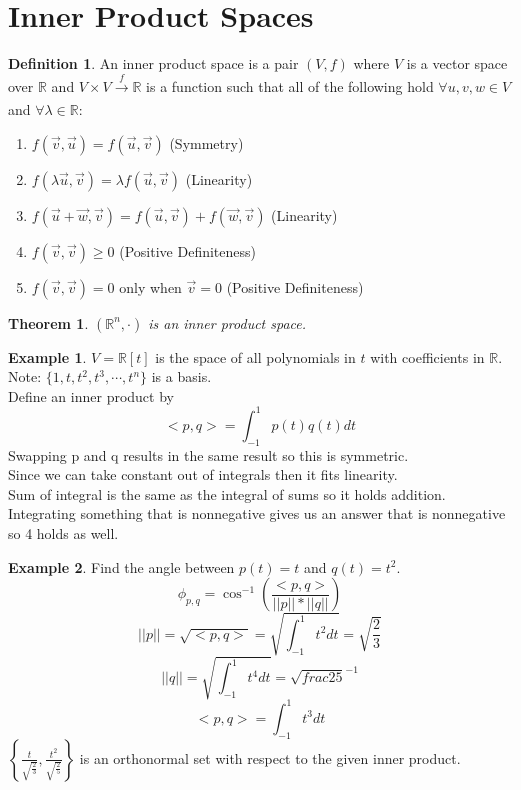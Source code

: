 \documentclass{report}
\theoremstyle{plain}
\newtheorem*{thrm}{Theorem}
\theoremstyle{definition}
\newtheorem*{ex}{Example}
\newtheorem*{defn}{Definition}
\theoremstyle{plain}
\begin{document}
\section{Inner Product Spaces}
\begin{defn}
An inner product space is a pair $(V,f)$ where $V$ is a vector space over $\mathbb{R}$ and $V\times V\xrightarrow[]{f}\mathbb{R}$ is a function such that all of the following hold $\forall u,v,w\in V$ and $\forall \lambda \in \mathbb{R}$:
\begin{enumerate}
\item $f(\vec{v},\vec{u})=f(\vec{u},\vec{v})$ (Symmetry)
\item $f(\lambda \vec{u},\vec{v}) = \lambda f(\vec{u},\vec{v})$ (Linearity)
\item $f(\vec{u}+\vec{w},\vec{v})=f(\vec{u},\vec{v})+f(\vec{w},\vec{v})$ (Linearity)
\item $f(\vec{v},\vec{v}) \geq 0$ (Positive Definiteness)
\item $f(\vec{v},\vec{v})=0$ only when $\vec{v}=0$ (Positive Definiteness)
\end{enumerate}
\end{defn}
\begin{thrm}
$(\mathbb{R}^n, \cdot)$ is an inner product space.
\end{thrm}
\begin{ex}
$V=\mathbb{R}[t]$ is the space of all polynomials in $t$ with coefficients in $\mathbb{R}$.\\
Note: $\{1,t,t^2,t^3,\cdots,t^n\}$ is a basis.\\
Define an inner product by
\[ <p,q>=\int_{-1}^1p(t)q(t)dt \]
Swapping p and q results in the same result so this is symmetric.\\
Since we can take constant out of integrals then it fits linearity.\\
Sum of integral is the same as the integral of sums so it holds addition.\\
Integrating something that is nonnegative gives us an answer that is nonnegative so 4 holds as well.
\end{ex}
\begin{ex}
Find the angle between $p(t)=t$ and $q(t)=t^2$.
\[ \phi_{p,q}=\cos^{-1}(\frac{<p,q>}{||p||*||q||}) \]
\[ ||p|| = \sqrt{<p,q>} = \sqrt{\int_{-1}^1t^2dt}=\sqrt{\frac{2}{3}} \]
\[ ||q|| = \sqrt{\int_{-1}^1t^4dt} = \sqrt{frac{2}{5}}^{-1} \]
\[ <p,q>=\int_{-1}^1t^3dt \]
$\left\{\frac{t}{\sqrt{\frac{2}{3}}},\frac{t^2}{\sqrt{\frac{2}{5}}}\right\}$ is an orthonormal set with respect to the given inner product.
\end{ex}
\end{document}
